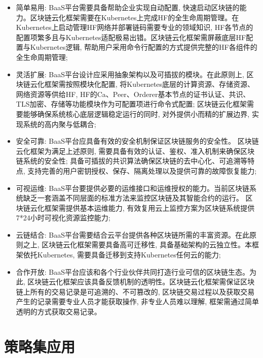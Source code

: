 \begin{itemize}[itemindent=2em]
    \item 简单易用: BaaS平台需要具备帮助企业实现自动配置, 快速启动区块链的能力。区块链云化框架需要在Kubernetes上完成HF的全生命周期管理。在Kubernetes上启动管理HF网络并部署链码需要专业的领域知识, HF各节点的配置项繁多且与Kubernetes适配极易出错。区块链云化框架需屏蔽底层HF配置与Kubernetes逻辑, 帮助用户采用命令行配置的方式提供完整的HF各组件的全生命周期管理;

    \item 灵活扩展: BaaS平台设计应采用抽象架构以及可插拔的模块。在此原则上, 区块链云化框架需按照模块化配置, 将Kubernetes底层的计算资源、存储资源、网络资源等供给HF, HF的Ca、Peer、Orderer基本节点的证书认证、共识、TLS加密、存储等功能模块作为可配置项进行命令式配置; 区块链云化框架需要能够确保系统核心底层逻辑稳定运行的同时, 对外提供小而精的扩展边界, 实现系统的高内聚与低耦合;

    \item 安全可靠: BaaS平台应具备有效的安全机制保证区块链服务的安全性。 区块链云化框架为满足上述原则, 需要具备有效的认证、鉴权、准入机制来确保区块链系统的安全性; 具备可插拔的共识算法确保区块链的去中心化、可追溯等特点, 支持完善的用户密钥授权、保存、隔离处理以及提供可靠的故障恢复能力;

    \item 可视运维: BaaS平台要提供必要的运维接口和运维授权的能力。当前区块链系统缺乏一套涵盖不同层面的标准方法来监控区块链及其智能合约的运行。 区块链云化框架需提供基本运维能力, 有效复用云上监控方案为区块链系统提供7*24小时可视化资源监控能力;

    \item 云链结合: BaaS平台需要结合云平台提供各种区块链所需的丰富资源。在此原则之上, 区块链云化框架需要具备高可迁移性, 具备基础架构的云独立性。本框架依托Kubernetes, 需要具备迁移到支持Kubernetes任何云的能力;

    \item 合作开放: BaaS平台应该和各个行业伙伴共同打造行业可信的区块链生态。为此, 区块链云化框架应该具备反馈机制的透明性。区块链云化框架需保证区块链上所有的交易记录是可追溯的、不可篡改的, 区块链交易过程以及获取交易产生的记录需要专业人员才能获取操作, 非专业人员难以理解, 框架需通过简单透明的方式获取交易记录。
\end{itemize}

\section{策略集应用}\label{section: policy_set_application}

